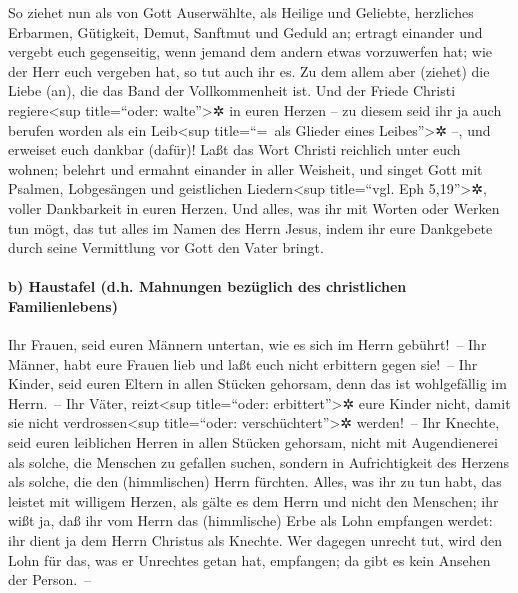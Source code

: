  So ziehet nun als von Gott Auserwählte, als Heilige und
Geliebte, herzliches Erbarmen, Gütigkeit, Demut, Sanftmut und Geduld an;
 ertragt einander und vergebt euch gegenseitig, wenn
jemand dem andern etwas vorzuwerfen hat; wie der Herr euch vergeben hat,
so tut auch ihr es.  Zu dem allem aber (ziehet) die Liebe
(an), die das Band der Vollkommenheit ist.  Und der
Friede Christi regiere\textless sup title=``oder: walte''\textgreater✲
in euren Herzen -- zu diesem seid ihr ja auch berufen worden als ein
Leib\textless sup title=``=~als Glieder eines Leibes''\textgreater✲ --,
und erweiset euch dankbar (dafür)!  Laßt das Wort Christi
reichlich unter euch wohnen; belehrt und ermahnt einander in aller
Weisheit, und singet Gott mit Psalmen, Lobgesängen und geistlichen
Liedern\textless sup title=``vgl. Eph 5,19''\textgreater✲, voller
Dankbarkeit in euren Herzen.  Und alles, was ihr mit
Worten oder Werken tun mögt, das tut alles im Namen des Herrn Jesus,
indem ihr eure Dankgebete durch seine Vermittlung vor Gott den Vater
bringt.

\hypertarget{b-haustafel-d.h.-mahnungen-bezuxfcglich-des-christlichen-familienlebens}{%
\paragraph{b) Haustafel (d.h. Mahnungen bezüglich des christlichen
Familienlebens)}\label{b-haustafel-d.h.-mahnungen-bezuxfcglich-des-christlichen-familienlebens}}

 Ihr Frauen, seid euren Männern untertan, wie es sich im
Herrn gebührt!~--  Ihr Männer, habt eure Frauen lieb und
laßt euch nicht erbittern gegen sie!~--  Ihr Kinder, seid
euren Eltern in allen Stücken gehorsam, denn das ist wohlgefällig im
Herrn.~--  Ihr Väter, reizt\textless sup title=``oder:
erbittert''\textgreater✲ eure Kinder nicht, damit sie nicht
verdrossen\textless sup title=``oder: verschüchtert''\textgreater✲
werden!~--  Ihr Knechte, seid euren leiblichen Herren in
allen Stücken gehorsam, nicht mit Augendienerei als solche, die Menschen
zu gefallen suchen, sondern in Aufrichtigkeit des Herzens als solche,
die den (himmlischen) Herrn fürchten.  Alles, was ihr zu
tun habt, das leistet mit willigem Herzen, als gälte es dem Herrn und
nicht den Menschen;  ihr wißt ja, daß ihr vom Herrn das
(himmlische) Erbe als Lohn empfangen werdet: ihr dient ja dem Herrn
Christus als Knechte.  Wer dagegen unrecht tut, wird den
Lohn für das, was er Unrechtes getan hat, empfangen; da gibt es kein
Ansehen der Person.~--

